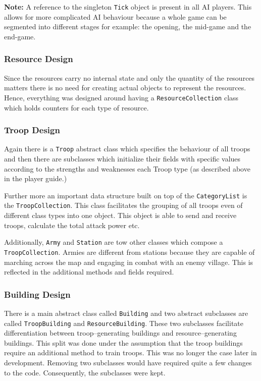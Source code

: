 \documentclass[12pt]{article}
\begin{document}
\textbf{Note:} A reference to the singleton \texttt{Tick} object
is present in all AI players. This allows for more complicated
AI behaviour because a whole game can be segmented into
different stages for example: the opening, the mid-game and the
end-game.

\subsubsection{Resource Design}

Since the resources carry no internal state and only the
quantity of the resources matters there is no need for creating
actual objects to represent the resources. Hence, everything was
designed around having a \texttt{ResourceCollection} class which
holds counters for each type of resource.

\subsubsection{Troop Design}

Again there is a \texttt{Troop} abstract class which specifies
the behaviour of all troops and then there are subclasses which
initialize their fields with specific values according to the
strengths and weaknesses each Troop type (as described above in
the player guide.)

Further more an important data structure built on top of the
\texttt{CategoryList} is the \texttt{TroopCollection}. This
class facilitates the grouping of all troops even of different
class types into one object. This object is able to send and
receive troops, calculate the total attack power etc.

Additionally, \texttt{Army} and \texttt{Station} are tow other
classes which compose a \texttt{TroopCollection}. Armies are
different from stations because they are capable of marching
across the map and engaging in combat with an enemy village.
This is reflected in the additional methods and fields required.

\subsubsection{Building Design}

There is a main abstract class called \texttt{Building} and two
abstract subclasses are called \texttt{TroopBuilding} and
\texttt{ResourceBuilding}. These two subclasses facilitate
differentiation between troop--generating buildings and
resource--generating buildings. This split was done under the
assumption that the troop buildings require an additional method
to train troops. This was no longer the case later in
development. Removing two subclasses would have required
quite a few changes to the code. Consequently, the subclasses
were kept.
\end{document}
